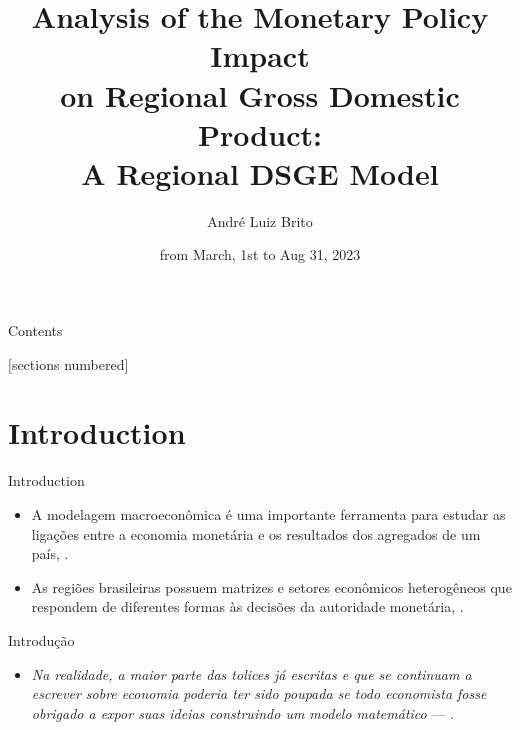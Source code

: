\documentclass[10pt]{beamer}
\title{Analysis of the Monetary Policy Impact \\ 
	on Regional Gross Domestic Product: \\ 
	A Regional DSGE Model}
\author{André Luiz Brito}
\institute{PPGDE-UFPR}
\date{from March, 1st to Aug 31, 2023}
\let\olditem\item
\renewcommand{\item}{%
	\olditem\vspace{5pt}}
\begin{document}
	
\begin{frame}
		
\maketitle
		
\end{frame}

	
\begin{frame}{Contents}
		
[sections numbered]
\tableofcontents[hideallsubsections]
		
\end{frame}

	
\section{Introduction}
	
	
\begin{frame}{Introduction}
		
\begin{itemize}
	\item A modelagem macroeconômica é uma importante ferramenta para estudar as ligações entre a economia monetária e os resultados dos agregados de um país, \textcite{gali_monetary_2015}.
	\item As regiões brasileiras possuem matrizes e setores econômicos heterogêneos que respondem de diferentes formas às decisões da autoridade monetária, \textcite{bertanha_efeitos_2008}.
\end{itemize}

\end{frame}


\begin{frame}{Introdução}
	
	\begin{itemize}
		\item \textit{Na realidade, a maior parte das tolices já escritas e que se continuam a escrever sobre economia poderia ter sido poupada se todo economista fosse obrigado a expor suas ideias construindo um modelo matemático} --- \textcite[p.68]{simonsen_microeconomia_1979}.
	\end{itemize}
	
\end{frame}
\end{document}
